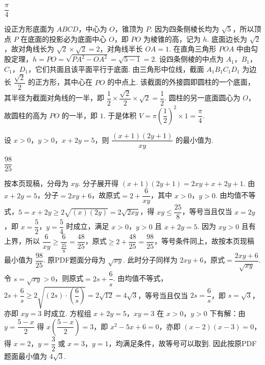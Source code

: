 \begin{answer}
\(\dfrac{\pi}{4}\)
\end{answer}

\begin{solution}
设正方形底面为 \(ABCD\)，中心为 \(O\)，锥顶为 \(P\). 因为四条侧棱长均为 \(\sqrt{5}\)，所以顶点 \(P\) 在底面的投影必为底面中心 \(O\)，即 \(PO\) 为棱锥的高，记为 \(h\). 底面边长为 \(\sqrt{2}\)，故对角线长为 \(\sqrt{2}\times\sqrt{2}=2\)，对角线半长 \(OA=1\). 在直角三角形 \(POA\) 中由勾股定理，\(h=PO=\sqrt{PA^{2}-OA^{2}}=\sqrt{5-1}=2\). 设四条侧棱的中点为 \(A_{1}\)，\(B_{1}\)，\(C_{1}\)，\(D_{1}\)，它们共面且该平面平行于底面. 由三角形中位线，截面 \(A_{1}B_{1}C_{1}D_{1}\) 为边长 \(\dfrac{\sqrt{2}}{2}\) 的正方形，其中心在 \(PO\) 的中点上. 该截面的外接圆即圆柱的一个底面，其半径为截面对角线的一半，即 \(\dfrac{1}{2}\times\dfrac{\sqrt{2}}{2}\times\sqrt{2}=\dfrac{1}{2}\). 圆柱的另一底面圆心为 \(O\)，故圆柱的高为 \(PO\) 的一半，即 \(1\). 于是体积 \(V=\pi\left(\dfrac{1}{2}\right)^{2}\times 1=\dfrac{\pi}{4}\).
\end{solution}

\begin{problem}
设 \(x>0\)，\(y>0\)，\(x+2y=5\)，则 \(\dfrac{(x+1)(2y+1)}{xy}\) 的最小值为\fillinblank{}.
\end{problem}

\begin{answer}
\(\dfrac{98}{25}\)
\end{answer}

\begin{solution}
按本页现稿，分母为 \(xy\). 分子展开得 \(\left(x+1\right)\left(2y+1\right)=2xy+x+2y+1\). 由 \(x+2y=5\)，分子\(=2xy+6\)，故原式\(=2+\dfrac{6}{xy}\)，其中 \(x>0\)，\(y>0\). 由均值不等式，\(5=x+2y\ge 2\sqrt{\left(x\right)\left(2y\right)}=2\sqrt{2xy}\)，得 \(xy\le\dfrac{25}{8}\)，等号当且仅当 \(x=2y\)，即 \(x=\dfrac{5}{2}\)，\(y=\dfrac{5}{4}\) 时成立，满足 \(x>0\)，\(y>0\) 且 \(x+2y=5\). 因为 \(xy>0\) 且有上界，所以 \(\dfrac{6}{xy}\ge\dfrac{6}{\frac{25}{8}}=\dfrac{48}{25}\)，原式\(\ge 2+\dfrac{48}{25}=\dfrac{98}{25}\)，等号条件同上，故按本页现稿最小值为 \(\dfrac{98}{25}\). 原PDF题面分母为 \(\sqrt{xy}\). 此时分子同样为 \(2xy+6\)，原式\(=\dfrac{2xy+6}{\sqrt{xy}}\). 令 \(s=\sqrt{xy}>0\)，则原式\(=2s+\dfrac{6}{s}\). 由均值不等式，\(2s+\dfrac{6}{s}\ge 2\sqrt{\left(2s\right)\cdot\left(\dfrac{6}{s}\right)}=2\sqrt{12}=4\sqrt{3}\)，等号当且仅当 \(2s=\dfrac{6}{s}\)，即 \(s=\sqrt{3}\)，亦即 \(xy=3\) 时成立. 方程组 \(x+2y=5\)，\(xy=3\) 在 \(x>0\)，\(y>0\) 下有解：由 \(y=\dfrac{5-x}{2}\) 得 \(x\left(\dfrac{5-x}{2}\right)=3\)，即 \(x^{2}-5x+6=0\)，亦即 \(\left(x-2\right)\left(x-3\right)=0\)，得 \(x=2\)，\(y=\dfrac{3}{2}\) 或 \(x=3\)，\(y=1\)，均满足条件，故等号可以取到. 因此按原PDF题面最小值为 \(4\sqrt{3}\).
\end{solution}


